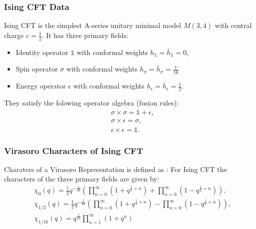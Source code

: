 \subsubsection{Ising CFT Data}
Ising CFT is the simplest A-series unitary minimal model $M(3,4)$ with central charge $c=\tfrac{1}{2}$. 
It has three primary fields:
\begin{itemize}
  \item Identity operator $\mathbb{1}$ with conformal weights 
    $h_{\mathbb{1}}=\bar{h}_{\mathbb{1}}=0$, 
  \item Spin operator $\sigma$ with conformal weights 
    $h_{\sigma}=\bar{h}_{\sigma}= \tfrac{1}{16}$
  \item Energy operator $\epsilon$ with conformal weights 
    $h_{\epsilon}=\bar{h}_{\epsilon}=\tfrac{1}{2}$.
\end{itemize}
They satisfy the folowing operator algebra (fusion rules):
\begin{align}
  &\sigma \times \sigma = \mathbb{1} + \epsilon, \\
  &\sigma \times \epsilon = \sigma, \\
  &\epsilon \times \epsilon = \mathbb{1}.
\end{align}

\subsubsection{Virasoro Characters of Ising CFT}

Charaters of a Virasoro Representation is defined as :
For Ising CFT the characters of the three primary fields are given by:
\begin{align}
  &\chi_0(q)=\frac{1}{2}q^{-\frac{1}{48}}\left(\prod_{n=0}^\infty\left(1+q^{\frac{1}{2}+n}\right)+\prod_{n=0}^\infty\left(1-q^{\frac{1}{2}+n}\right)\right),\\
&\chi_{1/2}(q)=\frac{1}{2}q^{-\frac{1}{48}}\left(\prod_{n=0}^\infty\left(1+q^{\frac{1}{2}+n}\right)-\prod_{n=0}^\infty\left(1-q^{\frac{1}{2}+n}\right)\right),\\
&\chi_{1/16}(q)= q^{\frac{1}{24}}\prod_{n=1}^\infty\left(1+q^n\right)
\end{align}


